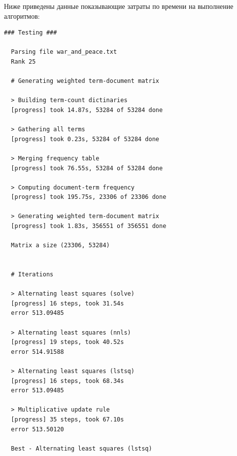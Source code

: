 
\newpage

Ниже приведены данные показывающие затраты по времени на выполнение алгоритмов:
\\

\begin{lstlisting}[caption=Затраты по времени на выполнение алгоритмов]
  ### Testing ###

  Parsing file war_and_peace.txt
  Rank 25

  # Generating weighted term-document matrix

  > Building term-count dictinaries
  [progress] took 14.87s, 53284 of 53284 done

  > Gathering all terms
  [progress] took 0.23s, 53284 of 53284 done

  > Merging frequency table
  [progress] took 76.55s, 53284 of 53284 done

  > Computing document-term frequency
  [progress] took 195.75s, 23306 of 23306 done

  > Generating weighted term-document matrix
  [progress] took 1.83s, 356551 of 356551 done

  Matrix a size (23306, 53284)


  # Iterations

  > Alternating least squares (solve)
  [progress] 16 steps, took 31.54s
  error 513.09485

  > Alternating least squares (nnls)
  [progress] 19 steps, took 40.52s
  error 514.91588

  > Alternating least squares (lstsq)
  [progress] 16 steps, took 68.34s
  error 513.09485

  > Multiplicative update rule
  [progress] 35 steps, took 67.10s
  error 513.50120

  Best - Alternating least squares (lstsq)
\end{lstlisting}




